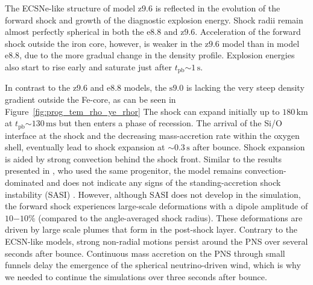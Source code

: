 \documentclass[fleqn,usenatbib]{mnras}
\newcommand{\tpb}{\ensuremath{t_{\text{pb}}}}
\newcommand{\km}{\ensuremath{\mathrm{km}}}
\newcommand{\s}{\ensuremath{\text{s}}}
\newcommand{\ms}{\ensuremath{\text{ms}}}
\newcommand{\onemg}{\ensuremath{\mathrm{e8.8}}\xspace}
\newcommand{\snine}{\ensuremath{\mathrm{s9.0}}\xspace}
\newcommand{\znine}{\ensuremath{\mathrm{z9.6}}\xspace}
\newcommand{\GEO}[1]{{\color{red}#1}}
\begin{document}
The ECSNe-like structure of model \znine is reflected in the evolution of the forward shock and growth of the diagnostic explosion energy. Shock radii remain almost perfectly spherical \GEO{in both the \onemg and \znine}. Acceleration of the forward shock outside the iron core, however, is weaker in the \znine model than in model \onemg, due to the more gradual change in the density profile. Explosion energies also start to rise early and saturate just after $\tpb\mathord{\sim}1\,\s$.

In contrast to the \znine and \onemg models, the \snine is lacking the very steep density gradient outside the Fe-core, as can be seen in Figure~\ref{fig:prog_tem_rho_ye_rhor}
The shock can expand initially up to $180\,\km$ at $\tpb\mathord{\sim}130\,\ms$ but then \GEO{enters a phase of recession}. The \GEO{arrival} of the Si/O interface at the shock and \GEO{the decreasing mass-accretion rate} within the oxygen shell, eventually lead to shock expansion at $\mathord{\sim}0.3\,\s$ after bounce. Shock expansion is aided by strong convection behind the shock front. Similar to the results presented in \cite{Glas2019}, who used the same progenitor, the model remains convection-dominated and does not indicate any signs of the standing-accretion shock instability (SASI) \citep{Blondin2003,Foglizzo2007}.
However, although SASI does not develop in the simulation, the forward shock experiences \GEO{large-scale deformations with a dipole amplitude of $10\mathord{-}10\%$ (compared to the angle-averaged shock radius)}. These deformations are driven by large scale plumes that form in the post-shock layer. 
Contrary to the ECSN-like models, strong non-radial motions persist \GEO{around the PNS} over several seconds after bounce. Continuous mass accretion on the PNS through small funnels delay the emergence of the spherical neutrino-driven wind, which is why we needed to continue the simulations over three seconds after bounce.
\end{document}
